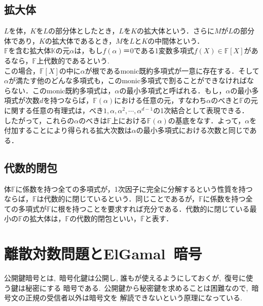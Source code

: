 \par
\subsection{拡大体}
\par

$L$を体，$K$を$L$の部分体としたとき，$L$を$K$の拡大体という．さらに$M$が$L$の部分体であり，$K$の拡大体であるとき，$M$を$L$と$K$の中間体という．\\
$\mathbb {F}$を含む拡大体$\mathbb {K}$の元$\alpha $は，もし$f(\alpha )＝0$である1変数多項式$f(X)\in \mathbb {F}[X]$があるなら，$\mathbb {F}$上代数的であるという.\\
この場合，$\mathbb {F}[X]$の中に$\alpha $が根であるmonic既約多項式が一意に存在する．そして$\alpha $が満たす他のどんな多項式も，このmonic多項式で割ることができなければならない．このmonic既約多項式は，$\alpha $の最小多項式と呼ばれる．もし，$\alpha $の最小多項式が次数$d$を持つならば，$\mathbb {F}(\alpha )$における任意の元，すなわち$\alpha $のべきと$\mathbb {F}$の元に関する任意の有理式は，べき$1,\alpha , \alpha ^2,\cdots ,\alpha ^{d-1}$の1次結合として表現できる．\\
したがって，これらの$\alpha $のべきは$\mathbb {F}$上における$\mathbb {F}(\alpha )$の基底をなす．よって，$\alpha $を付加することにより得られる拡大次数は$\alpha $の最小多項式における次数と同じである．\\

\par
\subsection{代数的閉包}
\par
体$\mathbb {F}$に係数を持つ全ての多項式が，1次因子に完全に分解するという性質を持つならば，$\mathbb {F}$は代数的に閉じているという．同じことであるが，$\mathbb {F}$に係数を持つ全ての多項式が$\mathbb {F}$に根を持つことを要求すれば充分である．代数的に閉じている最小の$\mathbb {F}$の拡大体は，$\mathbb {F}$の代数的閉包といい，$\mathbb {\overline{F}}$と表す．\\

\par


\section{離散対数問題とElGamal\ 暗号}
公開鍵暗号とは,\ 暗号化鍵は公開し, 誰もが使えるようにしておくが,\ 復号に使う鍵は秘密にする
暗号である.\ 公開鍵から秘密鍵を求めることは困難なので,\ 暗号文の正規の受信者以外は暗号文を
解読できないという原理になっている.


